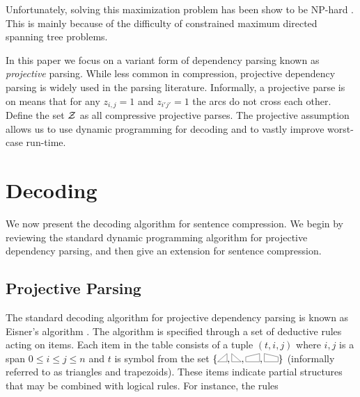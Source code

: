 \documentclass[11pt]{article}
\newcommand{\rtrap}{\scalebox{0.2}{\tikz{
    \coordinate (A) at (0,0);
    \coordinate (B) at (90:1.5cm);
    \coordinate (C) at (2.5,0.9cm);
    \coordinate (D) at (0:2.5cm);
    \draw[line width = 0.05cm] (A)--(B)--(C)--(D)--cycle;
    }}}
\newcommand{\ltrap}{\scalebox{0.2}{\tikz{
    \coordinate (A) at (0,0);
    \coordinate (B) at (90:1.5cm);
    \coordinate (C) at (-2.5,0.9cm);
    \coordinate (D) at (180:2.5cm);
    \draw[line width = 0.05cm] (A)--(B)--(C)--(D)--cycle;
    }}}
\newcommand{\rtri}{\scalebox{0.2}{\tikz{
    \coordinate (A) at (0,0);
    \coordinate (B) at (90:1.5cm);
    \coordinate (C) at (180:-1.7cm);
    \draw[line width = 0.05cm] (A)--(B)--(C)--cycle;
    }}}
\newcommand{\ltri}{\scalebox{0.2}{\tikz{
    \coordinate (A) at (0,0);
    \coordinate (B) at (90:1.5cm);
    \coordinate (C) at (180:1.7cm);
    \draw[line width = 0.05cm] (A)--(B)--(C)--cycle;
    }}}
\begin{document}
Unfortunately, solving this maximization problem has been show to be NP-hard \cite{}. This is mainly because of the difficulty of constrained maximum directed spanning tree problems.  

In this paper we focus on a variant form of dependency parsing known
as \textit{projective} parsing. While less common in compression,
projective dependency parsing is widely used in the parsing
literature.  Informally, a projective parse is  on means that for any $z_{i,j}=1$ and
$z_{i'j'}=1$ the arcs do not cross each other. Define the set ${\cal Z}$ as all compressive projective parses. 
The projective assumption allows us to use dynamic programming for decoding and to vastly improve worst-case
run-time.













\section{Decoding}


We now present the decoding algorithm for sentence compression. We begin by
reviewing the standard dynamic programming algorithm for projective
dependency parsing, and then give an extension for sentence 
compression.

\subsection{Projective Parsing}

The standard decoding algorithm for projective dependency parsing is
known as Eisner's algorithm \cite{eisner, mcdonald}.  The algorithm is
specified through a set of deductive rules acting on items.  Each item
in the table consists of a tuple $(t, i, j)$ where $i, j$ is a span
$0\leq i \leq j \leq n$ and $t$ is symbol from the set
$\{\ltri,\rtri, \ltrap, \rtrap\}$ (informally referred to as triangles
and trapezoids). These items indicate partial structures that may be 
combined with logical rules. For instance, the rules
\end{document}
